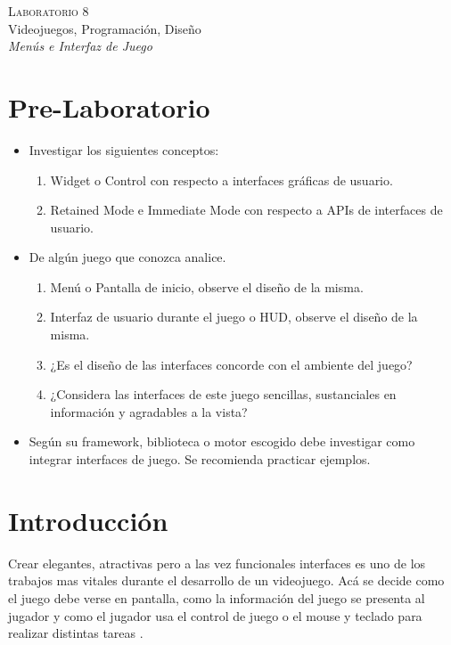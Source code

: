 \begin{center}
\textsc{\Large Laboratorio 8}~\\
{\large Videojuegos, Programación, Diseño}~\\
\emph{Menús e Interfaz de Juego}
\end{center}

\section{Pre-Laboratorio}
\begin{itemize}
\item Investigar los siguientes conceptos:
\begin{enumerate}
  \item Widget o Control con respecto a interfaces gráficas de usuario.
  \item Retained Mode e Immediate Mode con respecto a APIs de interfaces de usuario.
\end{enumerate}
\item De algún juego que conozca analice.
\begin{enumerate}
  \item Menú o Pantalla de inicio, observe el diseño de la misma.
  \item Interfaz de usuario durante el juego o HUD, observe el diseño de la misma.
  \item ¿Es el diseño de las interfaces concorde con el ambiente del juego?
  \item ¿Considera las interfaces de este juego sencillas, sustanciales en información y agradables a la vista?
\end{enumerate}
\item Según su framework, biblioteca o motor escogido debe investigar como integrar interfaces de juego. Se recomienda practicar ejemplos.
\end{itemize}

\section{Introducción}
Crear elegantes, atractivas pero a las vez funcionales interfaces es uno de los trabajos mas vitales durante el desarrollo de un videojuego. Acá se decide como el juego debe verse en pantalla, como la información del juego se presenta al jugador y como el jugador usa el control de juego o el mouse y teclado para realizar distintas tareas \cite[p.~26]{jenkinscreatinggames}.

